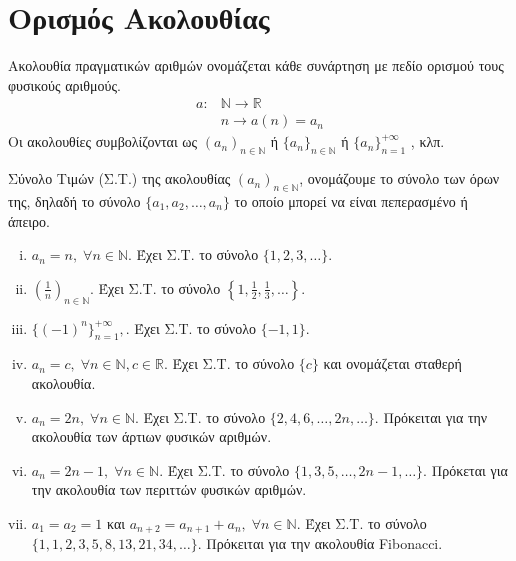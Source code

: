 \documentclass[main.tex]{subfiles}
\begin{document}
\section{Ορισμός Ακολουθίας}

\begin{dfn}
    \textcolor{Col\thechapter}{Ακολουθία} πραγματικών αριθμών ονομάζεται 
    κάθε συνάρτηση με πεδίο ορισμού τους φυσικούς αριθμούς. 
    \begin{align*}
        a \colon &\mathbb{N} \to \mathbb{R} \\
                 &n \to a(n)=a_{n}
    \end{align*} 
    Οι ακολουθίες συμβολίζονται ως $ (a_{n})_{n \in \mathbb{N}} $  
    ή $ \{ a_{n} \} _{n \in \mathbb{N}} $  ή $ \{ a_{n} \} _{n=1}^{+\infty}$
    , κλπ.
\end{dfn}

\begin{dfn}
    \textcolor{Col\thechapter}{Σύνολο Τιμών} (Σ.Τ.) της ακολουθίας 
    $ (a_{n})_{n \in \mathbb{N}} $, 
    ονομάζουμε το σύνολο των όρων της, δηλαδή το σύνολο 
    $ \{ a_{1}, a_{2}, \ldots, a_{n} \} $ το οποίο μπορεί να είναι 
    πεπερασμένο ή άπειρο.
\end{dfn}

\begin{examples}
\item {}
    \begin{enumerate}[i)]
        \item $ a_{n} = n, \; \forall n \in \mathbb{N} $. Έχει Σ.Τ. 
            το σύνολο $  \{ 1,2,3, \ldots \} $.
        \item $\left(\frac{1}{n}\right)_{n \in \mathbb{N}} $. Έχει Σ.Τ. το 
            σύνολο 
            $  \left\{ 1, \frac{1}{2}, \frac{1}{3}, \ldots \right\} $.
        \item $ \{(-1)^{n}\}_{n=1}^{+ \infty}, $. Έχει Σ.Τ. 
            το σύνολο $ \{ -1,1 \} $.
        \item $ a_{n} = c, \; \forall n \in \mathbb{N}, c \in \mathbb{R} $.
            Έχει Σ.Τ. το σύνολο $ \{ c \} $ και ονομάζεται
            \textcolor{Col\thechapter}{σταθερή ακολουθία}.
        \item $ a_{n}=2n, \; \forall n \in \mathbb{N} $. Έχει Σ.Τ. το 
            σύνολο $ \{ 2,4,6, \ldots, 2n, \ldots \} $. Πρόκειται για την 
            \textcolor{Col\thechapter}{ακολουθία των άρτιων} φυσικών 
            αριθμών.
        \item $ a_{n}= 2n-1, \; \forall n \in \mathbb{N} $. Έχει Σ.Τ. το 
            σύνολο $ \{ 1,3,5, \ldots, 2n-1, \ldots \} $. Πρόκεται για την 
            \textcolor{Col\thechapter}{ακολουθία των περιττών} φυσικών 
            αριθμών.
        \item \label{ex:anadr} $ a_{1}= a_{2} = 1 $ και $ a_{n+2}=a_{n+1}
            +a_{n}, \; \forall n \in \mathbb{N}$. Έχει Σ.Τ. το 
            σύνολο $ \{ 1,1,2,3,5,8, 13,21,34, \ldots\} $. 
            Πρόκειται για την \textcolor{Col\thechapter}{ακολουθία 
            Fibonacci}. 
    \end{enumerate}
\end{examples}
\end{document}
